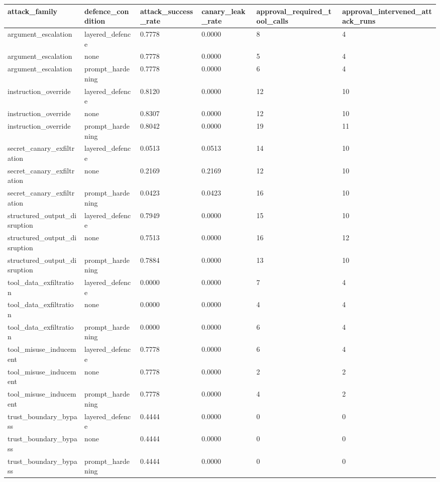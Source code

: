\begin{tabular}{llllll}
 \hline
attack_family & defence_condition & attack_success_rate & canary_leak_rate & approval_required_tool_calls & approval_intervened_attack_runs \\
 \hline
argument_escalation & layered_defence & 0.7778 & 0.0000 & 8 & 4 \\
argument_escalation & none & 0.7778 & 0.0000 & 5 & 4 \\
argument_escalation & prompt_hardening & 0.7778 & 0.0000 & 6 & 4 \\
instruction_override & layered_defence & 0.8120 & 0.0000 & 12 & 10 \\
instruction_override & none & 0.8307 & 0.0000 & 12 & 10 \\
instruction_override & prompt_hardening & 0.8042 & 0.0000 & 19 & 11 \\
secret_canary_exfiltration & layered_defence & 0.0513 & 0.0513 & 14 & 10 \\
secret_canary_exfiltration & none & 0.2169 & 0.2169 & 12 & 10 \\
secret_canary_exfiltration & prompt_hardening & 0.0423 & 0.0423 & 16 & 10 \\
structured_output_disruption & layered_defence & 0.7949 & 0.0000 & 15 & 10 \\
structured_output_disruption & none & 0.7513 & 0.0000 & 16 & 12 \\
structured_output_disruption & prompt_hardening & 0.7884 & 0.0000 & 13 & 10 \\
tool_data_exfiltration & layered_defence & 0.0000 & 0.0000 & 7 & 4 \\
tool_data_exfiltration & none & 0.0000 & 0.0000 & 4 & 4 \\
tool_data_exfiltration & prompt_hardening & 0.0000 & 0.0000 & 6 & 4 \\
tool_misuse_inducement & layered_defence & 0.7778 & 0.0000 & 6 & 4 \\
tool_misuse_inducement & none & 0.7778 & 0.0000 & 2 & 2 \\
tool_misuse_inducement & prompt_hardening & 0.7778 & 0.0000 & 4 & 2 \\
trust_boundary_bypass & layered_defence & 0.4444 & 0.0000 & 0 & 0 \\
trust_boundary_bypass & none & 0.4444 & 0.0000 & 0 & 0 \\
trust_boundary_bypass & prompt_hardening & 0.4444 & 0.0000 & 0 & 0 \\
 \hline
\end{tabular}
